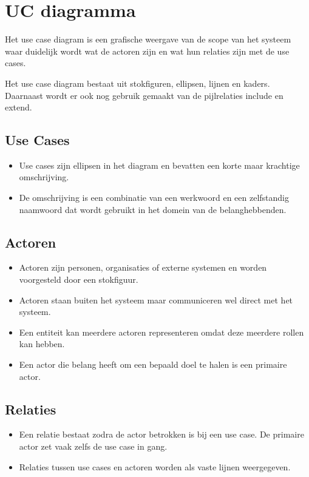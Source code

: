 \section{UC diagramma}
Het use case diagram \cite{UCDiagram} is een grafische weergave van de scope van het systeem waar duidelijk wordt wat de actoren zijn en wat hun relaties zijn met de use cases.
 
Het use case diagram bestaat uit stokfiguren, ellipsen, lijnen en kaders. Daarnaast wordt er ook nog gebruik gemaakt van de pijlrelaties include en extend.

\subsection{Use Cases}
\begin{itemize}
	\item Use cases zijn ellipsen in het diagram en bevatten een korte maar krachtige omschrijving.
	\item De omschrijving is een combinatie van een werkwoord en een zelfstandig naamwoord dat wordt gebruikt in het domein van de belanghebbenden.
\end{itemize}

\subsection{Actoren}
\begin{itemize}
	\item Actoren zijn personen, organisaties of externe systemen en worden voorgesteld door een stokfiguur.
	\item Actoren staan buiten het systeem maar communiceren wel direct met het systeem.
	\item Een entiteit kan meerdere actoren representeren omdat deze meerdere rollen kan hebben.
	\item Een actor die belang heeft om een bepaald doel te halen is een primaire actor.
\end{itemize}

\subsection{Relaties}
\begin{itemize}
	\item  Een relatie bestaat zodra de actor betrokken is bij een use case. De primaire actor zet vaak zelfs de use case in gang.
  \item Relaties tussen use cases en actoren worden als vaste lijnen weergegeven.
\end{itemize}

